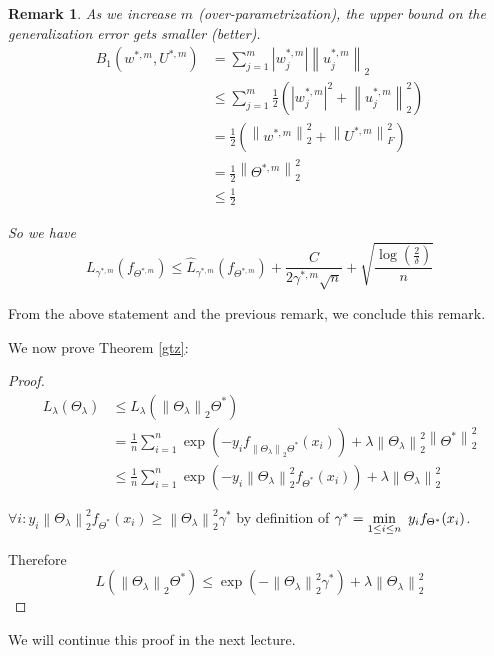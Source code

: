 \documentclass[11pt]{article}
\newtheorem{remark}{Remark}
\newcommand{\norm}[1]{\left\lVert#1\right\rVert}
\newcommand{\normt}[1]{\left\lVert#1\right\rVert_2}
\newcommand{\abs}[1]{\left\lvert#1\right\rvert}
\begin{document}
\begin{remark} As we increase $m$ (over-parametrization), the upper bound on the generalization error gets smaller (better).
	\begin{align*}
		B_1(w^{*,m}, U^{*,m}) & = \sum\limits_{j=1}^m \abs{w_j^{*,m}} \normt{u_j^{*,m}}      \\
		                      & \leq \sum\limits_{j=1}^m \frac{1}{2} \left(\abs{w_j^{*,m}}^2
		+\normt{u_j^{*,m}}^2\right)                                                          \\
		                      & = \frac{1}{2} \left(\normt{w^{*,m}}^2
		+\norm{U^{*,m}}_F^2\right)                                                           \\
		                      & =\frac{1}{2} \normt{\Theta^{*,m}}^2                          \\
		                      & \leq \frac{1}{2}
	\end{align*}

	So we have
	$$L_{\gamma^{*,m}}(f_{\Theta^{*,m}}) \leq \hat{L}_{\gamma^{*,m}}(f_{\Theta^{*,m}})
		+ \frac{C}{2\gamma^{*,m}\sqrt{n}} + \sqrt{\frac{\log(\frac{2}{\delta})}{n}}$$
\end{remark}

From the above statement and the previous remark, we conclude this remark.

We now prove Theorem \ref{gtz}:

\begin{proof}
	\begin{align*}
		L_\lambda(\Theta_\lambda) & \leq
		L_\lambda(\normt{\Theta_\lambda} \Theta^*)                    \\
		                          & = \frac{1}{n} \sum\limits_{i=1}^n
		\exp\left(-y_i f_{\normt{\Theta_\lambda}\Theta^*}\left(x_i\right)\right)
		+\lambda \normt{\Theta_\lambda}^2 \normt{\Theta^*}^2          \\
		                          & \leq \frac{1}{n}
		\sum\limits_{i=1}^n \exp(-y_i \normt{\Theta_\lambda}^2 f_{\Theta^*}(x_i))
		+ \lambda \normt{\Theta_\lambda}^2
	\end{align*}


	$\forall i: y_i \normt{\Theta_\lambda}^2 f_{\Theta^*} (x_i) \geq \normt{\Theta_\lambda}^2 \gamma^*$
	by definition of $\gamma^* = \underset{1 \leq i \leq n}{\min} \enskip y_i f_{\Theta^*} (x_i)$.

	Therefore
	$$L(\normt{\Theta_\lambda} \Theta^*) \leq \exp(-\normt{\Theta_\lambda}^2 \gamma^*)
		+\lambda\normt{\Theta_\lambda}^2$$
\end{proof}

We will continue this proof in the next lecture.



\end{document}
